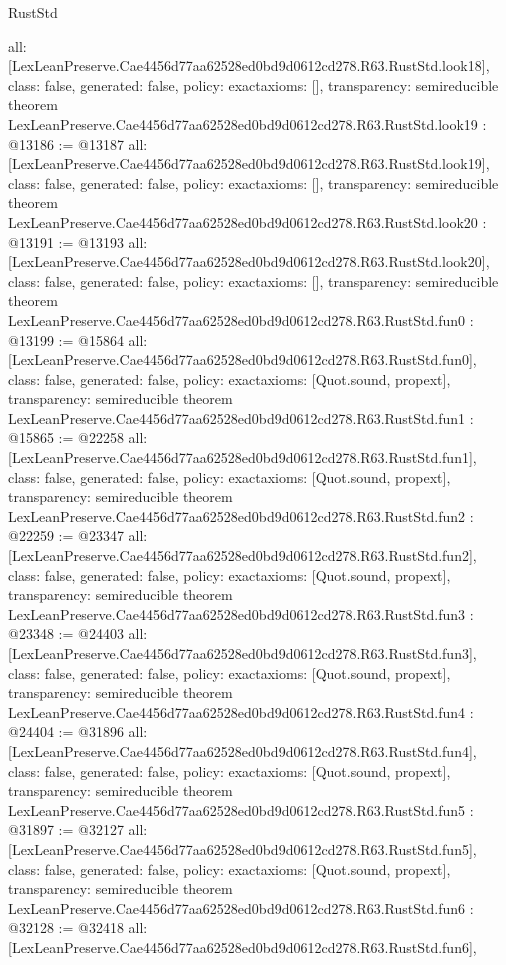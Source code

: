 \begin{lexlean}{RustStd}
\begin{coremodule}
{  all: [LexLeanPreserve.Cae4456d77aa62528ed0bd9d0612cd278.R63.RustStd.look18],
  class: false,
  generated: false,
  policy: exact{axioms: []},
  transparency: semireducible
}
theorem LexLeanPreserve.Cae4456d77aa62528ed0bd9d0612cd278.R63.RustStd.look19 : @13186 := @13187 {
  all: [LexLeanPreserve.Cae4456d77aa62528ed0bd9d0612cd278.R63.RustStd.look19],
  class: false,
  generated: false,
  policy: exact{axioms: []},
  transparency: semireducible
}
theorem LexLeanPreserve.Cae4456d77aa62528ed0bd9d0612cd278.R63.RustStd.look20 : @13191 := @13193 {
  all: [LexLeanPreserve.Cae4456d77aa62528ed0bd9d0612cd278.R63.RustStd.look20],
  class: false,
  generated: false,
  policy: exact{axioms: []},
  transparency: semireducible
}
theorem LexLeanPreserve.Cae4456d77aa62528ed0bd9d0612cd278.R63.RustStd.fun0 : @13199 := @15864 {
  all: [LexLeanPreserve.Cae4456d77aa62528ed0bd9d0612cd278.R63.RustStd.fun0],
  class: false,
  generated: false,
  policy: exact{axioms: [Quot.sound, propext]},
  transparency: semireducible
}
theorem LexLeanPreserve.Cae4456d77aa62528ed0bd9d0612cd278.R63.RustStd.fun1 : @15865 := @22258 {
  all: [LexLeanPreserve.Cae4456d77aa62528ed0bd9d0612cd278.R63.RustStd.fun1],
  class: false,
  generated: false,
  policy: exact{axioms: [Quot.sound, propext]},
  transparency: semireducible
}
theorem LexLeanPreserve.Cae4456d77aa62528ed0bd9d0612cd278.R63.RustStd.fun2 : @22259 := @23347 {
  all: [LexLeanPreserve.Cae4456d77aa62528ed0bd9d0612cd278.R63.RustStd.fun2],
  class: false,
  generated: false,
  policy: exact{axioms: [Quot.sound, propext]},
  transparency: semireducible
}
theorem LexLeanPreserve.Cae4456d77aa62528ed0bd9d0612cd278.R63.RustStd.fun3 : @23348 := @24403 {
  all: [LexLeanPreserve.Cae4456d77aa62528ed0bd9d0612cd278.R63.RustStd.fun3],
  class: false,
  generated: false,
  policy: exact{axioms: [Quot.sound, propext]},
  transparency: semireducible
}
theorem LexLeanPreserve.Cae4456d77aa62528ed0bd9d0612cd278.R63.RustStd.fun4 : @24404 := @31896 {
  all: [LexLeanPreserve.Cae4456d77aa62528ed0bd9d0612cd278.R63.RustStd.fun4],
  class: false,
  generated: false,
  policy: exact{axioms: [Quot.sound, propext]},
  transparency: semireducible
}
theorem LexLeanPreserve.Cae4456d77aa62528ed0bd9d0612cd278.R63.RustStd.fun5 : @31897 := @32127 {
  all: [LexLeanPreserve.Cae4456d77aa62528ed0bd9d0612cd278.R63.RustStd.fun5],
  class: false,
  generated: false,
  policy: exact{axioms: [Quot.sound, propext]},
  transparency: semireducible
}
theorem LexLeanPreserve.Cae4456d77aa62528ed0bd9d0612cd278.R63.RustStd.fun6 : @32128 := @32418 {
  all: [LexLeanPreserve.Cae4456d77aa62528ed0bd9d0612cd278.R63.RustStd.fun6],
}
\end{coremodule}
\end{lexlean}
